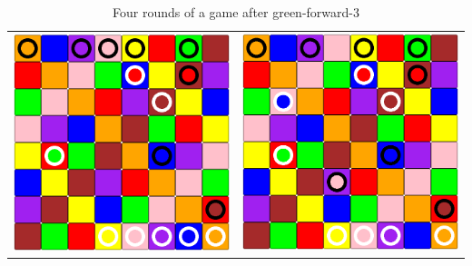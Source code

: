 \documentclass[a4paper, 11pt]{beamer}
\begin{document}
\begin{frame}
\begin{table}[htbp]
\begin{tabular}{c c}
    \includegraphics[scale = 0.11]{mathieu2_5.png} & \includegraphics[scale = 0.11]{mathieu2_6.png} \\
  \end{tabular}
  \caption{Four rounds of a game after green-forward-3}
 \end{table}
\end{frame}
\end{document}

